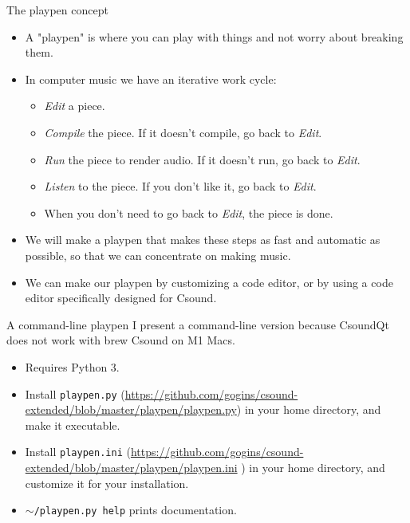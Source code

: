 \documentclass{beamer}
\begin{document}
\begin{frame}{The playpen concept}
\begin{itemize}
\item A "playpen" is where you can play with things and not worry 
about breaking them.
\item In computer music we have an iterative work cycle:
\begin{itemize}
\item \textit{Edit} a piece.
\item \textit{Compile} the piece. If it doesn't compile, go back to \textit{Edit}.
\item \textit{Run} the piece to render audio. If it doesn't run, go back to \emph{Edit}.
\item \textit{Listen} to the piece. If you don't like it, go back to \emph{Edit}.
\item When you don't need to go back to \emph{Edit}, the piece is done.
\end{itemize}
\item  We will make a playpen that makes these steps as fast and 
automatic as possible, so that we can concentrate on making music.
\item We can make our playpen by customizing a code editor, or by 
using a code editor specifically designed for Csound.
\end{itemize}
\end{frame}

\begin{frame}{A command-line playpen}
I present a command-line version because CsoundQt does not work with brew Csound on M1 Macs.
\begin{itemize}
\item Requires Python 3.
\item Install \texttt{playpen.py} (\url{https://github.com/gogins/csound-extended/blob/master/playpen/playpen.py}) in your home directory, and make it executable.
\item Install \texttt{playpen.ini} (\url{https://github.com/gogins/csound-extended/blob/master/playpen/playpen.ini} ) in your home directory, and customize it for your installation.
\item \texttt{$\sim$/playpen.py help} prints documentation.
\end{itemize}
\end{frame}
\end{document}
